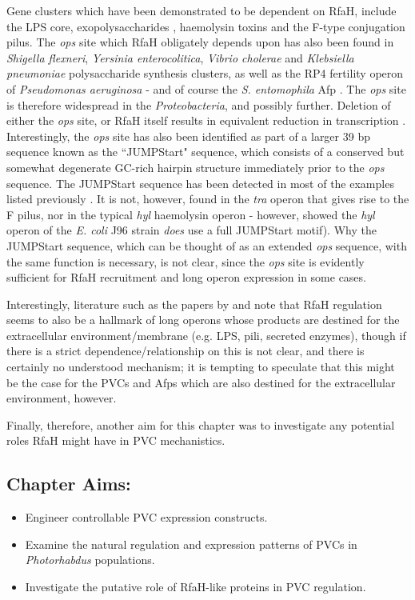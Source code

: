 Gene clusters which have been demonstrated to be dependent on RfaH, include the LPS core, exopolysaccharides \citep{Wilkinson1972}, haemolysin toxins \citep{Landraud2003, Leeds1996, Leeds1997} and the F-type conjugation pilus. The \emph{ops} site which RfaH obligately depends upon has also been found in \emph{Shigella flexneri}, \emph{Yersinia enterocolitica}, \emph{Vibrio cholerae} and \emph{Klebsiella pneumoniae} polysaccharide synthesis clusters, as well as the RP4 fertility operon of \emph{Pseudomonas aeruginosa} \citep{Bailey1997} - and of course the \emph{S. entomophila} Afp \citep{Hurst2007a}. The \emph{ops} site is therefore widespread in the \emph{Proteobacteria}, and possibly further. Deletion of either the \emph{ops} site, or RfaH itself results in equivalent reduction in transcription \citep{Bailey1997}. Interestingly, the \emph{ops} site has also been identified as part of a larger 39 bp sequence known as the ``JUMPStart" sequence, which consists of a conserved but somewhat degenerate GC-rich hairpin structure immediately prior to the \emph{ops} sequence. The JUMPStart sequence has been detected in most of the examples listed previously \citep{Wang1998}. It is not, however, found in the \emph{tra} operon that gives rise to the F pilus, nor in the typical \emph{hyl} haemolysin operon \citep{Nieto1996} - however, \cite{Leeds2007} showed the \emph{hyl} operon of the \emph{E. coli} J96 strain \emph{does} use a full JUMPStart motif). Why the JUMPStart sequence, which can be thought of as an extended \emph{ops} sequence, with the same function is necessary, is not clear, since the \emph{ops} site is evidently sufficient for RfaH recruitment and long operon expression in some cases.

Interestingly, literature such as the papers by \cite{Bailey1996} and \cite{Santangelo2002} note that RfaH regulation seems to also be a hallmark of long operons whose products are destined for the extracellular environment/membrane (e.g. LPS, pili, secreted enzymes), though if there is a strict dependence/relationship on this is not clear, and there is certainly no understood mechanism; it is tempting to speculate that this might be the case for the PVCs and Afps which are also destined for the extracellular environment, however. 

Finally, therefore, another aim for this chapter was to investigate any potential roles RfaH might have in PVC mechanistics. 

\subsection*{Chapter Aims:}
\begin{itemize}
	\item Engineer controllable PVC expression constructs.
	\item Examine the natural regulation and expression patterns of PVCs in \emph{Photorhabdus} populations.
	\item Investigate the putative role of RfaH-like proteins in PVC regulation.
\end{itemize}
\clearpage


